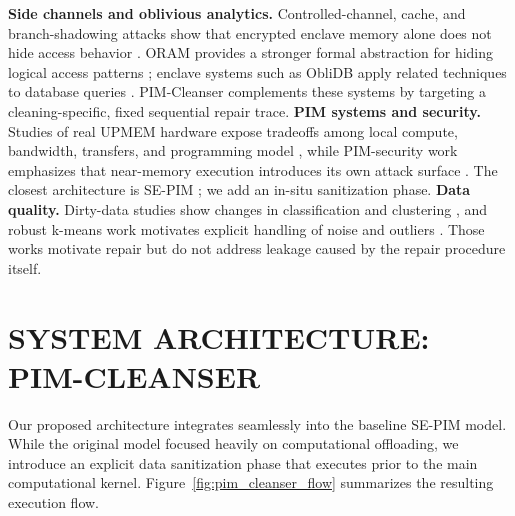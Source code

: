 \documentclass[conference]{IEEEtran}
\begin{document}
\textbf{\textcolor{accessblue}{Side channels and oblivious analytics.}}
Controlled-channel, cache, and branch-shadowing attacks show that encrypted
enclave memory alone does not hide access behavior
\cite{Xu:2015,Gruss:2016,Lee:2017}. ORAM provides a stronger formal abstraction
for hiding logical access patterns \cite{Goldreich:1996}; enclave systems such
as ObliDB apply related techniques to database queries \cite{Eskandarian:2019}.
PIM-Cleanser complements these systems by targeting a cleaning-specific, fixed
sequential repair trace. \textbf{\textcolor{accessblue}{PIM systems and
security.}} Studies of real UPMEM hardware expose tradeoffs among local
compute, bandwidth, transfers, and programming model \cite{GomezLuna:2021},
while PIM-security work emphasizes that near-memory execution introduces its
own attack surface \cite{Arafin:2020}. The closest architecture is SE-PIM
\cite{Kha:2023}; we add an in-situ sanitization phase. \textbf{\textcolor{accessblue}{Data quality.}}
Dirty-data studies show changes in classification and clustering
\cite{Qi:2021}, and robust k-means work motivates explicit handling of noise
and outliers \cite{Chawla:2013,Im:2020}. Those works motivate repair but do not
address leakage caused by the repair procedure itself.

\section{SYSTEM ARCHITECTURE: PIM-CLEANSER}

Our proposed architecture integrates seamlessly into the baseline SE-PIM model. While the original model focused heavily on computational offloading, we introduce an explicit data sanitization phase that executes prior to the main computational kernel. Figure~\ref{fig:pim_cleanser_flow} summarizes the resulting execution flow.
\end{document}
